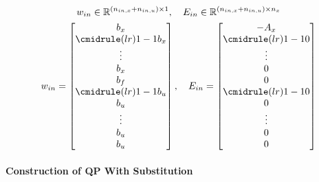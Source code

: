 \begin{gather*}
    w_{in}\in \mathbb{R}^{(n_{in,x}+n_{in,u})\times 1}, \quad E_{in} \in \mathbb{R}^{(n_{in,x}+n_{in,u})\times n_x}\\
    w_{in} = \begin{bmatrix}
        b_x                    \\
        \cmidrule(lr){1-1} b_x \\
        \vdots                 \\
        b_x                    \\
        b_f                    \\
        \cmidrule(lr){1-1} b_u \\
        b_u                    \\
        \vdots                 \\
        b_u                    \\
        b_u
    \end{bmatrix}, \quad
    E_{in} =\begin{bmatrix}
        -A_x                 \\
        \cmidrule(lr){1-1} 0 \\
        \vdots               \\
        0                    \\
        0                    \\
        \cmidrule(lr){1-1} 0 \\
        0                    \\
        \vdots               \\
        0                    \\
        0
    \end{bmatrix}
\end{gather*}

\paragraph{Construction of QP With Substitution}\label{cftoc_QP_with_subs}

